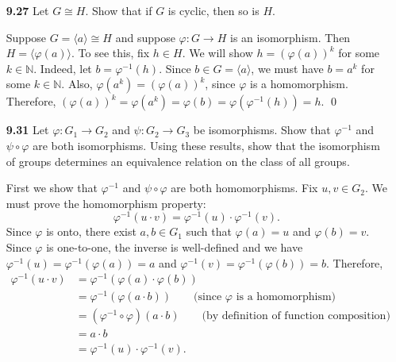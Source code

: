 \documentclass[12pt,reqno]{amsart}
\newcommand{\N}{\ensuremath{\mathbb{N}}}
\newcommand{\<}{\ensuremath{\langle}}
\renewcommand{\>}{\ensuremath{\rangle}}
\renewcommand{\phi}{\ensuremath{\varphi}}
\begin{document}
\begin{enumerate}[{\bf 1.}]
\medskip
{}  
Assume $hk = kh$ for all $h\in H$ and $k\in K$.
Suppose $x \in H\cap K$, then $x \in H$ implies $\<x\>$ is a subgroup of $H$ so,
by Lagrange's Theorem $|x|$ divides $|H| = 4$.
Similarly $x \in K$ implies $\<x\>$ is a subgroup of $K$ so,
by Lagrange's Theorem $|x|$ divides $|K| = 5$. Since $|x|$ divides both 4 and 5,
we must have $|x| = 1$, so $x = e$.  That is $H\cap K = \{e\}$. \qed

\vskip1cm

\item[{\bf 9.27}]
Let $G \cong H$. Show that if $G$ is cyclic, then so is $H$.

\medskip
{} Suppose $G = \<a\> \cong H$ and suppose 
$\varphi: G \rightarrow H$ is an isomorphism.  Then 
$H = \<\varphi(a)\>$.  To see this, fix $h\in H$.  We will show 
$h = (\varphi(a))^k$ for some $k\in \N$. Indeed, let $b = \varphi^{-1}(h)$.
Since $b\in G = \<a\>$, we must have $b = a^k$ for some $k\in \N$.
Also, $\varphi(a^k) = (\varphi(a))^k$, since $\varphi$ is a homomorphism. 
Therefore, $(\varphi(a))^k = \varphi(a^k) = \varphi(b) = \varphi(\varphi^{-1}(h)) = h$.
\qed
\vskip1cm

\item[{\bf 9.31}]
Let $\phi : G_1 \rightarrow G_2$ and  $\psi : G_2 \rightarrow G_3$  be
isomorphisms. Show that  $\phi^{-1}$ and $\psi \circ \phi$ are both
isomorphisms. Using these results, show that the isomorphism of groups
determines an equivalence relation on the class of all groups.

\medskip
{} First we show that $\phi^{-1}$ and $\psi\circ \phi$
are both homomorphisms.
Fix $u, v \in G_2$.  We must prove the homomorphism property:
\begin{equation}
  \label{eq:1}
\phi^{-1}(u \cdot v) = \phi^{-1}(u) \cdot \phi^{-1}(v).
\end{equation}
Since $\phi$ is onto, there exist $a, b\in G_1$ such that $\phi(a) = u$ and
$\phi(b) = v$.  Since $\phi$ is one-to-one, the inverse is well-defined and we
have $\phi^{-1}(u) = \phi^{-1}(\phi(a)) =a$ and 
$\phi^{-1}(v) = \phi^{-1}(\phi(b)) = b$.  Therefore,
\begin{align*}
\phi^{-1}(u  \cdot v) &= \phi^{-1}(\phi(a) \cdot  \phi(b))\\
&= \phi^{-1}(\phi(a \cdot  b)) \qquad \text{(since $\phi$ is a homomorphism)}\\
&= (\phi^{-1}\circ\phi)(a \cdot  b)\qquad \text{(by definition of function composition)}\\
&= a \cdot  b\\
&= \phi^{-1}(u) \cdot \phi^{-1}(v).
\end{align*}


\end{enumerate}
\end{document}
